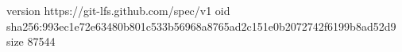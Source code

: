 version https://git-lfs.github.com/spec/v1
oid sha256:993ec1e72e63480b801c533b56968a8765ad2c151e0b2072742f6199b8ad52d9
size 87544
